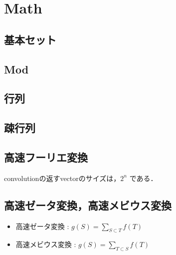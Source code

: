 \section{Math}

\subsection{基本セット}


\subsection{Mod}


\subsection{行列}



\subsection{疎行列}



\subsection{高速フーリエ変換}
convolutionの返すvectorのサイズは，$2^n$ である．


\subsection{高速ゼータ変換，高速メビウス変換}
\begin{itemize}
  \item 高速ゼータ変換 : $g(S) = \displaystyle\sum_{S \subset T} f(T)$
  \item 高速メビウス変換 : $g(S) = \displaystyle\sum_{T \subset S} f(T)$
\end{itemize}


